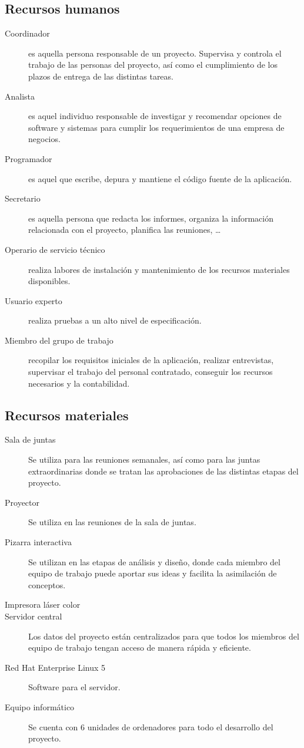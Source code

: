 \documentclass[11pt,a4paper,spanish,twoside]{report}
\begin{document}
\subsection{Recursos humanos}
\begin{description}
\item[Coordinador] es aquella persona responsable de un proyecto. Supervisa y
  controla el trabajo de las personas del proyecto, así como el cumplimiento
  de los plazos de entrega de las distintas tareas. 

\item[Analista] es aquel individuo responsable de investigar y
  recomendar opciones de software y sistemas para cumplir los requerimientos
  de una empresa de negocios.  

\item[Programador] es aquel que escribe, depura y mantiene el código fuente
  de la aplicación.  

\item[Secretario] es aquella persona que redacta los informes, organiza la
  información relacionada con el proyecto, planifica las reuniones, \dots

\item[Operario de servicio técnico] realiza labores de instalación y
  mantenimiento de los recursos materiales disponibles.

\item[Usuario experto] realiza pruebas a un alto nivel de especificación.

\item[Miembro del grupo de trabajo] recopilar los requisitos iniciales de la
  aplicación, realizar entrevistas, supervisar el trabajo del personal
  contratado, conseguir los recursos necesarios y la contabilidad.

\end{description}

\subsection{Recursos materiales}
\begin{description}
\item[Sala de juntas] Se utiliza para las reuniones semanales, así como para las juntas extraordinarias donde se tratan las aprobaciones de las distintas etapas del proyecto.
\item[Proyector] Se utiliza en las reuniones de la sala de juntas.
\item[Pizarra interactiva] Se utilizan en las etapas de análisis y diseño, donde cada miembro del equipo de trabajo puede aportar sus ideas y facilita la asimilación de conceptos.
\item[Impresora láser color]
\item[Servidor central] Los datos del proyecto están centralizados para que todos los miembros del equipo de trabajo tengan acceso de manera rápida y eficiente.
\item[Red Hat Enterprise Linux 5] Software para el servidor.
\item[Equipo informático] Se cuenta con 6 unidades de ordenadores para todo el desarrollo del proyecto.  
\end{description}
\end{document}
